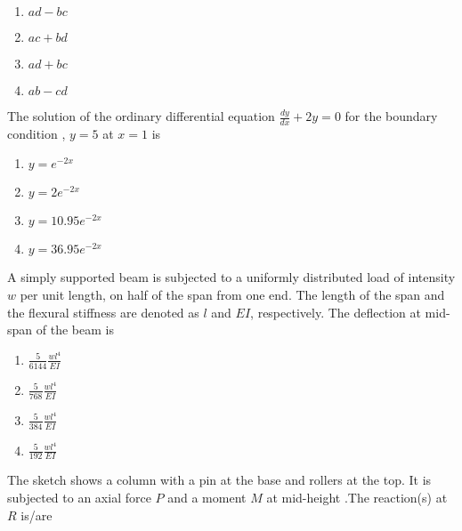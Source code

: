    \begin{multicols}{2}
       \begin{enumerate}
           \item $ad-bc$
           \item $ac+bd$
           \item $ad+bc$
           \item $ab-cd$
       \end{enumerate}
   \end{multicols}
   \item The solution of the ordinary differential equation $\frac{dy}{dx} + 2y = 0$ for the boundary condition , $y=5$ at $x=1$ is
   \begin{multicols}{4}
       \begin{enumerate}
           \item $y=e^{-2x}$
           \item $y=2e^{-2x}$
           \item $y=10.95e^{-2x}$
           \item $y=36.95e^{-2x}$
       \end{enumerate}
   \end{multicols}
   \item A simply supported beam is subjected to a uniformly distributed load of intensity $w$ per unit length, on half of the span from one end. The length of the span and the flexural stiffness are denoted as $l$ and $EI$, respectively. The deflection at mid-span of the beam is
   \begin{multicols}{4}
       \begin{enumerate}
           \item $\frac{5}{6144}\frac{wl^4}{EI}$
            \item $\frac{5}{768}\frac{wl^4}{EI}$
             \item $\frac{5}{384}\frac{wl^4}{EI}$
              \item $\frac{5}{192}\frac{wl^4}{EI}$
       \end{enumerate}
   \end{multicols}
   \item The sketch shows a column with a pin at the base and rollers at the top. It is subjected to an axial force $P$ and a moment $M$ at mid-height .The reaction(s) at $R$ is/are
